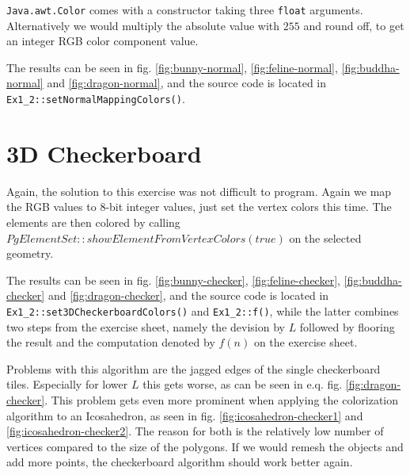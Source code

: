 \documentclass[a4paper,10pt,notitlepage]{scrreprt}
\begin{document}
\texttt{Java.awt.Color} comes with a constructor taking three \texttt{float}
arguments. Alternatively we would multiply the absolute value with $255$ and
round off, to get an integer RGB color component value.

The results can be seen in fig. \ref{fig:bunny-normal},
\ref{fig:feline-normal}, \ref{fig:buddha-normal} and \ref{fig:dragon-normal},
and the source code is located in \texttt{Ex1\_2::setNormalMappingColors()}.

\section{3D Checkerboard}

Again, the solution to this exercise was not difficult to program. Again we map
the RGB values to $8$-bit integer values, just set the vertex colors this time.
The elements are then colored by
calling $PgElementSet::showElementFromVertexColors(true)$ on the selected
geometry.

The results can be seen in fig. \ref{fig:bunny-checker},
\ref{fig:feline-checker}, \ref{fig:buddha-checker} and
\ref{fig:dragon-checker},
and the source code is located in \texttt{Ex1\_2::set3DCheckerboardColors()}
and \texttt{Ex1\_2::f()}, while the latter combines two steps from the exercise
sheet, namely the devision by $L$ followed by flooring the result and the
computation denoted by $f(n)$ on the exercise sheet.

Problems with this algorithm are the jagged edges of the single checkerboard
tiles. Especially for lower $L$ this gets worse, as can be seen in e.q. fig.
\ref{fig:dragon-checker}. This problem gets even more prominent when applying
the colorization algorithm to an Icosahedron, as seen in fig.
\ref{fig:icosahedron-checker1} and \ref{fig:icosahedron-checker2}. The reason
for both is the relatively low number of vertices compared to the size of the
polygons. If we would remesh the objects and add more points, the checkerboard
algorithm should work better again.
\end{document}
